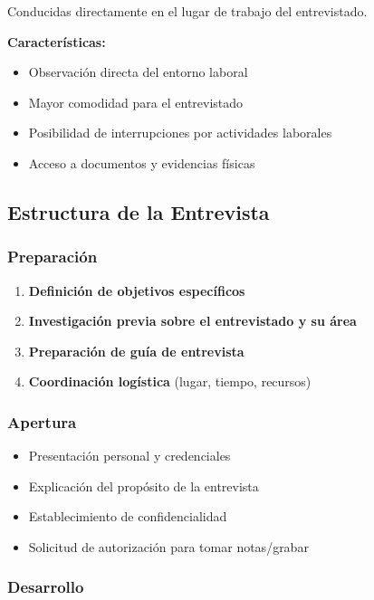 \documentclass[12pt,letterpaper,oneside]{book}
\begin{document}
Conducidas directamente en el lugar de trabajo del entrevistado.

\textbf{Características:}
\begin{itemize}
\item Observación directa del entorno laboral
\item Mayor comodidad para el entrevistado
\item Posibilidad de interrupciones por actividades laborales
\item Acceso a documentos y evidencias físicas
\end{itemize}

\subsection{Estructura de la Entrevista}

\subsubsection{Preparación}

\begin{enumerate}
\item \textbf{Definición de objetivos específicos}
\item \textbf{Investigación previa sobre el entrevistado y su área}
\item \textbf{Preparación de guía de entrevista}
\item \textbf{Coordinación logística} (lugar, tiempo, recursos)
\end{enumerate}

\subsubsection{Apertura}

\begin{itemize}
\item Presentación personal y credenciales
\item Explicación del propósito de la entrevista
\item Establecimiento de confidencialidad
\item Solicitud de autorización para tomar notas/grabar
\end{itemize}

\subsubsection{Desarrollo}
\end{document}
